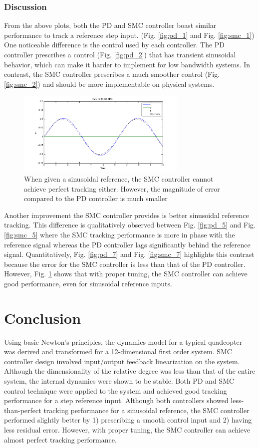 \documentclass[conference]{IEEEtran}
\begin{document}
\subsubsection{Discussion}
From the above plots, both the PD and SMC controller boast similar performance to track a reference step input. (Fig. \ref{fig:pd_1} and Fig. \ref{fig:smc_1}) One noticeable difference is the control used by each controller. The PD controller prescribes a control (Fig. \ref{fig:pd_2}) that has transient sinusoidal behavior, which can make it harder to implement for low bandwidth systems. In contrast, the SMC controller prescribes a much smoother control (Fig. \ref{fig:smc_2}) and should be more implementable on physical systems.
\begin{figure}[!ht]
\centering
\includegraphics[width=3.2in]{../smc_best.png}
\caption{When given a sinusoidal reference, the SMC controller cannot achieve perfect tracking either. However, the magnitude of error compared to the PD controller is much smaller}
\label{fig:smc_best}
\end{figure}
Another improvement the SMC controller provides is better sinusoidal reference tracking. This difference is qualitatively observed between Fig. \ref{fig:pd_5} and Fig. \ref{fig:smc_5} where the SMC tracking performance is more in phase with the reference signal whereas the PD controller lags significantly behind the reference signal. Quantitatively, Fig. \ref{fig:pd_7} and Fig. \ref{fig:smc_7} highlights this contrast because the error for the SMC controller is less than that of the PD controller. However, Fig. \ref{fig:smc_best} shows that with proper tuning, the SMC controller can achieve good performance, even for sinusoidal reference inputs.

\section{Conclusion} \label{conclude}
Using basic Newton's principles, the dynamics model for a typical quadcopter was derived and transformed for a 12-dimensional first order system. SMC controller design involved input/output feedback linearization on the system. Although the dimensionality of the relative degree was less than that of the entire system, the internal dynamics were shown to be stable. Both PD and SMC control technique were applied to the system and achieved good tracking performance for a step reference input. Although both controllers showed less-than-perfect tracking performance for a sinusoidal reference, the SMC controller performed slightly better by 1) prescribing a smooth control input and 2) having less residual error. However, with proper tuning, the SMC controller can achieve almost perfect tracking performance. 
\end{document}
